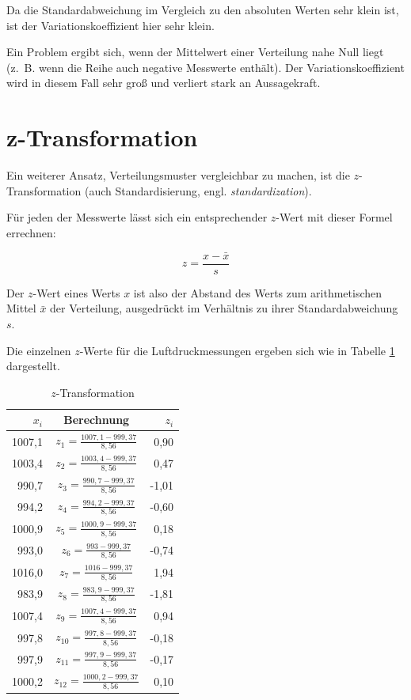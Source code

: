 \documentclass[
  11pt,
  ngerman,
  a4paper,
]{report}
\begin{document}
Da die Standardabweichung im Vergleich zu den absoluten Werten sehr klein ist, ist der Variationskoeffizient hier sehr klein.

Ein Problem ergibt sich, wenn der Mittelwert einer Verteilung nahe Null liegt (z.~B. wenn die Reihe auch negative Messwerte enthält). Der Variationskoeffizient wird in diesem Fall sehr groß und verliert stark an Aussagekraft.

\hypertarget{z-transformation}{%
\section{z-Transformation}\label{z-transformation}}

Ein weiterer Ansatz, Verteilungsmuster vergleichbar zu machen, ist die \(z\)-Transformation (auch Standardisierung, engl. \emph{standardization}).

Für jeden der Messwerte lässt sich ein entsprechender \(z\)-Wert mit dieser Formel errechnen:

\[
z=\frac{x-\bar{x}}{s}
\label{eq:z}
\]

Der \(z\)-Wert eines Werts \(x\) ist also der Abstand des Werts zum arithmetischen Mittel \(\bar{x}\) der Verteilung, ausgedrückt im Verhältnis zu ihrer Standardabweichung \(s\).

Die einzelnen \(z\)-Werte für die Luftdruckmessungen ergeben sich wie in Tabelle \ref{tab:trans} dargestellt.

\begin{table}

\caption{\label{tab:trans}$z$-Transformation}
\centering
\begin{tabular}[t]{rcr}
\toprule
$x_i$ & Berechnung & $z_i$\\
\midrule
1007,1 & $z_{1}=\frac{1007,1-999,37}{8,56}$\medskip & 0,90\\
1003,4 & $z_{2}=\frac{1003,4-999,37}{8,56}$\medskip & 0,47\\
990,7 & $z_{3}=\frac{990,7-999,37}{8,56}$\medskip & -1,01\\
994,2 & $z_{4}=\frac{994,2-999,37}{8,56}$\medskip & -0,60\\
1000,9 & $z_{5}=\frac{1000,9-999,37}{8,56}$\medskip & 0,18\\
993,0 & $z_{6}=\frac{993-999,37}{8,56}$\medskip & -0,74\\
1016,0 & $z_{7}=\frac{1016-999,37}{8,56}$\medskip & 1,94\\
983,9 & $z_{8}=\frac{983,9-999,37}{8,56}$\medskip & -1,81\\
1007,4 & $z_{9}=\frac{1007,4-999,37}{8,56}$\medskip & 0,94\\
997,8 & $z_{10}=\frac{997,8-999,37}{8,56}$\medskip & -0,18\\
997,9 & $z_{11}=\frac{997,9-999,37}{8,56}$\medskip & -0,17\\
1000,2 & $z_{12}=\frac{1000,2-999,37}{8,56}$\medskip & 0,10\\
\bottomrule
\end{tabular}
\end{table}
\end{document}
